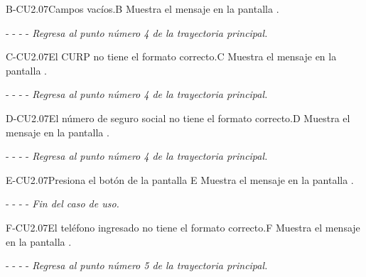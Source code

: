 	\begin{UCtrayectoriaA}{B-CU2.07}{Campos vacíos.}{B}
	    \UCpaso[\UCsist]Muestra el mensaje en la pantalla .
	    \item[- -] - - {\em Regresa al punto número 4 de la trayectoria principal.}
	\end{UCtrayectoriaA}

    
	\begin{UCtrayectoriaA}{C-CU2.07}{El CURP no tiene el formato correcto.}{C}
			\UCpaso[\UCsist] Muestra el mensaje  en la pantalla .
			\item[- -] - - {\em Regresa al punto número 4 de la trayectoria principal.} 
    \end{UCtrayectoriaA}

	\begin{UCtrayectoriaA}{D-CU2.07}{El número de seguro social no tiene el formato correcto.}{D}
			\UCpaso[\UCsist] Muestra el mensaje  en la pantalla .
			\item[- -] - - {\em Regresa al punto número 4 de la trayectoria principal.} 
    \end{UCtrayectoriaA}
    
	\begin{UCtrayectoriaA}{E-CU2.07}{Presiona el botón  de la pantalla }{E}
		\UCpaso[\UCsist] Muestra el mensaje  en la pantalla .
		\item[- -] - - {\em Fin del caso de uso.} 
	\end{UCtrayectoriaA}


	\begin{UCtrayectoriaA}{F-CU2.07}{El teléfono ingresado no tiene el formato correcto.}{F}
			\UCpaso[\UCsist] Muestra el mensaje  en la pantalla .
			\item[- -] - - {\em Regresa al punto número 5 de la trayectoria principal.} 
    \end{UCtrayectoriaA}
    
  
